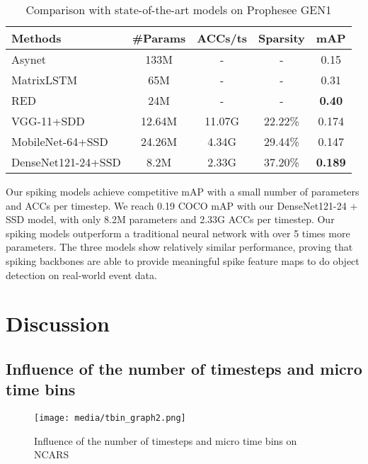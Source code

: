 \documentclass[conference]{IEEEtran}
\begin{document}
\begin{table}[]
\renewcommand{\arraystretch}{1.3}
\centering
\caption{Comparison with state-of-the-art models on Prophesee GEN1}
\begin{tabular}{lcccc}
\hline
\textbf{Methods}  &  \textbf{\#Params}  & \textbf{ACCs/ts}   & \textbf{Sparsity } & \textbf{mAP }   \\ \hline
Asynet \cite{asynet}      & 133M     & - & - & 0.15                       \\
MatrixLSTM \cite{matrixlstm}   & 65M    & - & -   & 0.31                   \\
RED \cite{1mpx} & 24M      & - & -     &   \textbf{0.40}          \\
\hline
VGG-11+SDD &  12.64M  & 11.07G & 22.22\%   & 0.174                       \\ 
MobileNet-64+SSD &  24.26M  & 4.34G & 29.44\%    & 0.147                       \\ 
DenseNet121-24+SSD  & 8.2M & 2.33G & 37.20\%     & \textbf{0.189}                       \\ 

\hline
\end{tabular}
\label{tab:gen1}
\end{table}

Our spiking models achieve competitive mAP with a small number of parameters and ACCs per timestep. We reach 0.19 COCO mAP with our DenseNet121-24 + SSD model, with only 8.2M parameters and 2.33G ACCs per timestep. Our spiking models outperform a traditional neural network with over 5 times more parameters. The three models show relatively similar performance, proving that spiking backbones are able to provide meaningful spike feature maps to do object detection on real-world event data. 

\section{Discussion}

\subsection{Influence of the number of timesteps and micro time bins\label{tbin}}


\begin{figure}[tb]
\centerline{\texttt{[image: media/tbin\_graph2.png]}}
\caption{Influence of the number of timesteps and micro time bins on NCARS}
\label{fig:tbin}
\end{figure}
\end{document}

